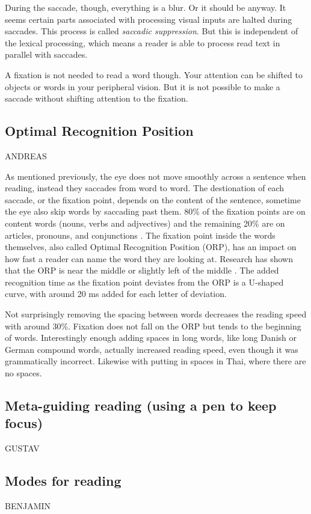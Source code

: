 During the saccade, though, everything is a blur. Or it should be anyway. It seems certain parts associated with processing visual inputs are halted during saccades. This process is called \textit{saccadic suppression}. But this is independent of the lexical processing, which means a reader is able to process read text in parallel with saccades.

A fixation is not needed to read a word though. Your attention can be shifted to objects or words in your peripheral vision. But it is not possible to make a saccade without shifting attention to the fixation.

\subsection{Optimal Recognition Position} \label{ORP}
ANDREAS

As mentioned previously, the eye does not move smoothly across a sentence when reading, instead they saccades from word to word. The destionation of each saccade, or the fixation point, depends on the content of the sentence, sometime the eye also skip words by saccading past them. 80\% of the fixation points are on content words (nouns, verbs and adjvectives) and the remaining 20\% are on articles, pronouns, and conjunctions \cite{eysenck_cognitive_2010}. The fixation point inside the words themselves, also called Optimal Recognition Position (ORP), has an impact on how fast a reader can name the word they are looking at. Research has shown that the ORP is near the middle or slightly left of the middle \cite{oregan_optimal_1992, nazir_letter_1998, oregan_convenient_1984}. The added recognition time as the fixation point deviates from the ORP is a U-shaped curve, with around 20 ms added for each letter of deviation.

Not surprisingly removing the spacing between words decreases the reading speed with around 30\%. Fixation does not fall on the ORP but tends to the beginning of words. Interestingly enough adding spaces in long words, like long Danish or German compound words, actually increased reading speed, even though it was grammatically incorrect. Likewise with putting in spaces in Thai, where there are no spaces.


\subsection{Meta-guiding reading (using a pen to keep focus)}
GUSTAV

\subsection{Modes for reading}
BENJAMIN

